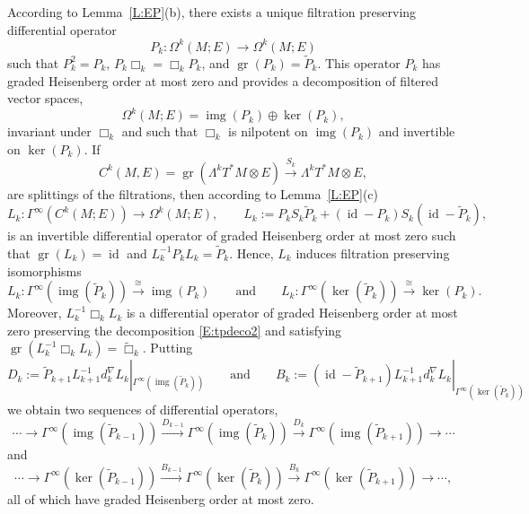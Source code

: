 \documentclass[reqno,12pt]{amsart}
\DeclareMathOperator{\img}{img}
\DeclareMathOperator{\gr}{gr}
\DeclareMathOperator{\id}{id}
\theoremstyle{plain}
\theoremstyle{definition}
\begin{document}
According to Lemma~\ref{L:EP}(b), there exists a unique filtration preserving differential operator
$$
P_k\colon\Omega^k(M;E)\to\Omega^k(M;E)
$$ 
such that $P_k^2=P_k$, $P_k\Box_k=\Box_kP_k$, and $\gr(P_k)=\tilde P_k$.
This operator $P_k$ has graded Heisenberg order at most zero and provides a decomposition of filtered vector spaces, 
\begin{equation}\label{E:Pdeco2}
\Omega^k(M;E)=\img(P_k)\oplus\ker(P_k),
\end{equation}
invariant under $\Box_k$ and such that $\Box_k$ is nilpotent on $\img(P_k)$ and invertible on $\ker(P_k)$.
If
$$
C^k(M,E)=\gr(\Lambda^kT^*M\otimes E)\xrightarrow{S_k}\Lambda^kT^*M\otimes E,
$$ 
are splittings of the filtrations, then according to Lemma~\ref{L:EP}(c)
\begin{equation}\label{E:tL2}
L_k\colon\Gamma^\infty(C^k(M;E))\to\Omega^k(M;E),\qquad
L_k:=P_kS_k\tilde P_k+(\id-P_k)S_k(\id-\tilde P_k),
\end{equation}
is an invertible differential operator of graded Heisenberg order at most zero such that $\gr(L_k)=\id$ and $L^{-1}_kP_kL_k=\tilde P_k$.
Hence, $L_k$ induces filtration preserving isomorphisms
$$
L_k\colon\Gamma^\infty(\img(\tilde P_k))\xrightarrow\cong\img(P_k)
\qquad\text{and}\qquad
L_k\colon\Gamma^\infty(\ker(\tilde P_k))\xrightarrow\cong\ker(P_k).
$$
Moreover, $L^{-1}_k\Box_kL_k$ is a differential operator of graded Heisenberg order at most zero preserving the decomposition \eqref{E:tpdeco2} and satisfying $\gr(L^{-1}_k\Box_kL_k)=\tilde\Box_k$.
Putting 
\begin{equation}\label{E:defDB2}
D_k:=\tilde P_{k+1}L_{k+1}^{-1}d^\nabla_kL_k|_{\Gamma^\infty(\img(\tilde P_k))}
\qquad\text{and}\qquad
B_k:=(\id-\tilde P_{k+1})L_{k+1}^{-1}d^\nabla_kL_k|_{\Gamma^\infty(\ker(\tilde P_k))}
\end{equation}
we obtain two sequences of differential operators,
\begin{equation}\label{E:TEDE}
\cdots\to\Gamma^\infty(\img(\tilde P_{k-1}))\xrightarrow{D_{k-1}}\Gamma^\infty(\img(\tilde P_k))\xrightarrow{D_k}\Gamma^\infty(\img(\tilde P_{k+1}))\to\cdots
\end{equation}
and
\begin{equation}\label{E:TEBE}
\cdots\to\Gamma^\infty(\ker(\tilde P_{k-1}))\xrightarrow{B_{k-1}}\Gamma^\infty(\ker(\tilde P_k))\xrightarrow{B_k}\Gamma^\infty(\ker(\tilde P_{k+1}))\to\cdots,
\end{equation}
all of which have graded Heisenberg order at most zero.
\end{document}
